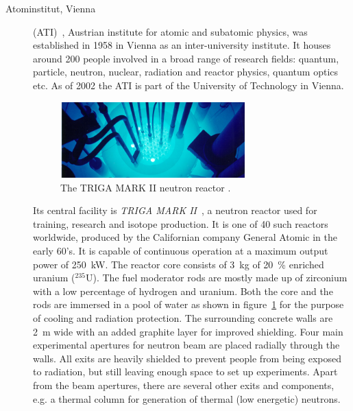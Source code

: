 \begin{description}
\item[Atominstitut, Vienna] (ATI)~\cite{AtomInst:00000}, Austrian institute for atomic and subatomic physics, was established in 1958 in Vienna as an inter-university institute. It houses around 200 people involved in a broad range of research fields: quantum, particle, neutron, nuclear, radiation and reactor physics, quantum optics etc. As of 2002 the ATI is part of the University of Technology in Vienna.
\begin{figure}[!t]
\centering
\includegraphics[width=0.7\textwidth]{01_introduction/pics/triga}
\caption{The TRIGA MARK II neutron reactor \cite{GeneralAtomics}.}
\label{fig:triga}
\end{figure}
Its central facility is \emph{TRIGA MARK II}~\cite{Triga:00000}, a neutron reactor used for training, research and isotope production. It is one of 40 such reactors worldwide, produced by the Californian company General Atomic in the early 60's. It is capable of continuous operation at a maximum output power of 250~kW. 
The reactor core consists of 3~kg of 20~\% enriched uranium ($^{235}$U). The fuel moderator rods are mostly made up of zirconium with a low percentage of hydrogen and uranium. Both the core and the rods are immersed in a pool of water as shown in figure~\ref{fig:triga} for the purpose of cooling and radiation protection. The surrounding concrete walls are 2~m wide with an added graphite layer for improved shielding. Four main experimental apertures for neutron beam are placed radially through the walls. All exits are heavily shielded to prevent people from being exposed to radiation, but still leaving enough space to set up experiments. Apart from the beam apertures, there are several other exits and components, e.g. a thermal column for generation of thermal (low energetic) neutrons.







\end{description}
